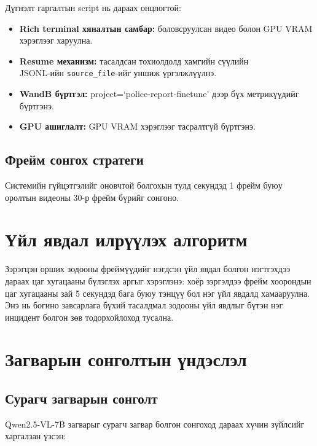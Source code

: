 Дүгнэлт гаргалтын script нь дараах онцлогтой:

\begin{itemize}
    \item \textbf{Rich terminal хяналтын самбар:} боловсруулсан видео болон GPU VRAM хэрэглээг харуулна.
    \item \textbf{Resume механизм:} тасалдсан тохиолдолд хамгийн сүүлийн \\ JSONL-ийн \texttt{source\_file}-ийг уншиж үргэлжлүүлнэ.
    \item \textbf{WandB бүртгэл:} project=`police-report-finetune' дээр бүх метрикүүдийг бүртгэнэ.
    \item \textbf{GPU ашиглалт:} GPU VRAM хэрэглээг тасралтгүй бүртгэнэ.
\end{itemize}

\subsection{Фрейм сонгох стратеги}

Системийн гүйцэтгэлийг оновчтой болгохын тулд секундэд 1 фрейм буюу оролтын видеоны 30-р фрейм бүрийг сонгоно.

\section*{Үйл явдал илрүүлэх алгоритм}

Зэрэгцэн орших зодооны фреймүүдийг нэгдсэн үйл явдал болгон нэгтгэхдээ дараах цаг хугацааны бүлэглэх аргыг хэрэглэнэ: хоёр зэргэлдээ фрейм хоорондын цаг хугацааны зай 5 секундэд бага буюу тэнцүү бол нэг үйл явдалд хамааруулна. Энэ нь богино завсарлага бүхий тасалдмал зодооны үйл явдлыг бүтэн нэг инцидент болгон зөв тодорхойлоход тусална.

\section{Загварын сонголтын үндэслэл}

\subsection{Сурагч загварын сонголт}

Qwen2.5-VL-7B загварыг сурагч загвар болгон сонгоход дараах хүчин зүйлсийг харгалзан үзсэн:

